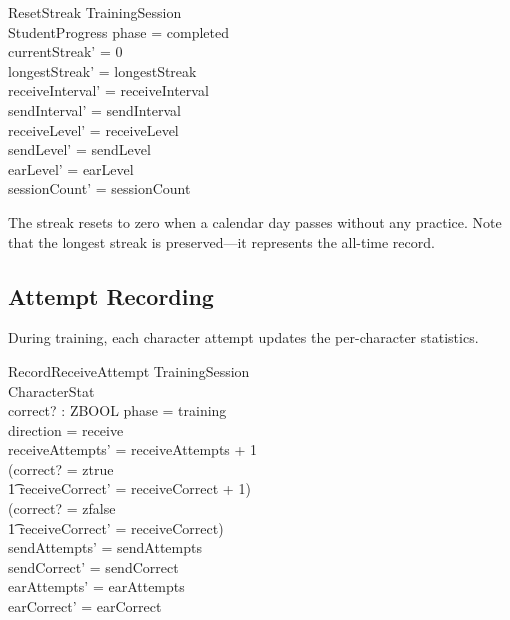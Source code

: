 \documentclass[a4paper,10pt,fleqn]{article}
\begin{document}
\begin{schema}{ResetStreak}
  \Xi TrainingSession \\
  \Delta StudentProgress
  \where
  phase = completed \\
  currentStreak' = 0 \\
  longestStreak' = longestStreak \\
  receiveInterval' = receiveInterval \\
  sendInterval' = sendInterval \\
  receiveLevel' = receiveLevel \\
  sendLevel' = sendLevel \\
  earLevel' = earLevel \\
  sessionCount' = sessionCount
\end{schema}

The streak resets to zero when a calendar day passes without any practice.
Note that the longest streak is preserved---it represents the all-time record.

\subsection{Attempt Recording}

During training, each character attempt updates the per-character statistics.

\begin{schema}{RecordReceiveAttempt}
  \Xi TrainingSession \\
  \Delta CharacterStat \\
  correct? : ZBOOL
  \where
  phase = training \\
  direction = receive \\
  receiveAttempts' = receiveAttempts + 1 \\
  (correct? = ztrue \\
  \t1 \land receiveCorrect' = receiveCorrect + 1) \\
  \lor (correct? = zfalse \\
  \t1 \land receiveCorrect' = receiveCorrect) \\
  sendAttempts' = sendAttempts \\
  sendCorrect' = sendCorrect \\
  earAttempts' = earAttempts \\
  earCorrect' = earCorrect
\end{schema}
\end{document}
